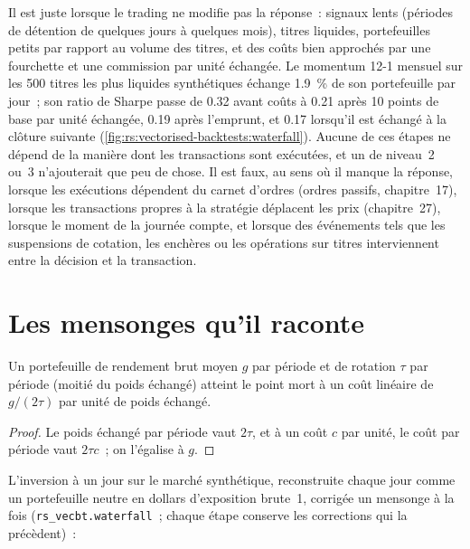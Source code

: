 Il est juste lorsque le trading ne modifie pas la réponse~: signaux lents (périodes de détention de quelques jours à quelques mois), titres liquides, portefeuilles petits par rapport
au volume des titres, et des coûts bien approchés par une fourchette et une commission par unité échangée. Le momentum 12-1 mensuel sur les 500 titres les plus liquides
synthétiques échange 1.9~\% de son portefeuille par jour~; son ratio de Sharpe passe de 0.32 avant coûts à 0.21 après 10 points de base par unité échangée,
0.19 après l'emprunt, et 0.17 lorsqu'il est échangé à la clôture suivante (\cref{fig:rs:vectorised-backtests:waterfall}). Aucune de ces étapes ne dépend de la manière dont les
transactions sont exécutées, et un  de niveau~2 ou~3 n'ajouterait que peu de chose. Il est faux, au sens où il manque la réponse, lorsque les exécutions dépendent du
carnet d'ordres (ordres passifs, chapitre~17), lorsque les transactions propres à la stratégie déplacent les prix (chapitre~27), lorsque le moment de la journée compte, et lorsque
des événements tels que les suspensions de cotation, les enchères ou les opérations sur titres interviennent entre la décision et la transaction.

\section{Les mensonges qu'il raconte}

\begin{proposition}\label{prop:rs:vectorised-backtests:breakeven}
Un portefeuille de rendement brut moyen $g$ par période et de rotation $\tau$ par période (moitié du poids échangé) atteint le point mort à un coût linéaire de
$g/(2\tau)$ par unité de poids échangé.
\end{proposition}

\begin{proof}
Le poids échangé par période vaut $2\tau$, et à un coût $c$ par unité, le coût par période vaut $2\tau c$~; on l'égalise à $g$.
\end{proof}

L'inversion à un jour sur le marché synthétique, reconstruite chaque jour comme un portefeuille neutre en dollars d'exposition brute~1, corrigée un mensonge à la fois
(\texttt{rs\_vecbt.waterfall}~; chaque étape conserve les corrections qui la précèdent)~:


